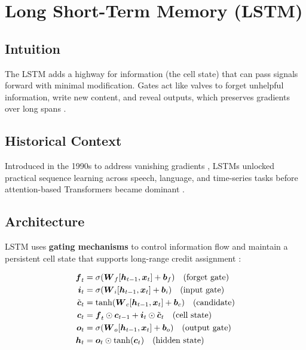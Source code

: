
\section{Long Short-Term Memory (LSTM) }
\label{sec:lstm}

\subsection*{Intuition}

The LSTM adds a highway for information (the cell state) that can pass signals forward with minimal modification. Gates act like valves to forget unhelpful information, write new content, and reveal outputs, which preserves gradients over long spans \cite{Hochreiter1997,GoodfellowEtAl2016}.

\subsection*{Historical Context}

Introduced in the 1990s to address vanishing gradients \cite{Hochreiter1997}, LSTMs unlocked practical sequence learning across speech, language, and time-series tasks before attention-based Transformers became dominant \cite{Vaswani2017}.


\subsection{Architecture}

LSTM uses \textbf{gating mechanisms} to control information flow and maintain a persistent cell state that supports long-range credit assignment \cite{Hochreiter1997,GoodfellowEtAl2016}:

\begin{align}
\boldsymbol{f}_t &= \sigma(\boldsymbol{W}_f [\boldsymbol{h}_{t-1}, \boldsymbol{x}_t] + \boldsymbol{b}_f) \quad \text{(forget gate)} \\
\boldsymbol{i}_t &= \sigma(\boldsymbol{W}_i [\boldsymbol{h}_{t-1}, \boldsymbol{x}_t] + \boldsymbol{b}_i) \quad \text{(input gate)} \\
\tilde{\boldsymbol{c}}_t &= \tanh(\boldsymbol{W}_c [\boldsymbol{h}_{t-1}, \boldsymbol{x}_t] + \boldsymbol{b}_c) \quad \text{(candidate)} \\
\boldsymbol{c}_t &= \boldsymbol{f}_t \odot \boldsymbol{c}_{t-1} + \boldsymbol{i}_t \odot \tilde{\boldsymbol{c}}_t \quad \text{(cell state)} \\
\boldsymbol{o}_t &= \sigma(\boldsymbol{W}_o [\boldsymbol{h}_{t-1}, \boldsymbol{x}_t] + \boldsymbol{b}_o) \quad \text{(output gate)} \\
\boldsymbol{h}_t &= \boldsymbol{o}_t \odot \tanh(\boldsymbol{c}_t) \quad \text{(hidden state)}
\end{align}

